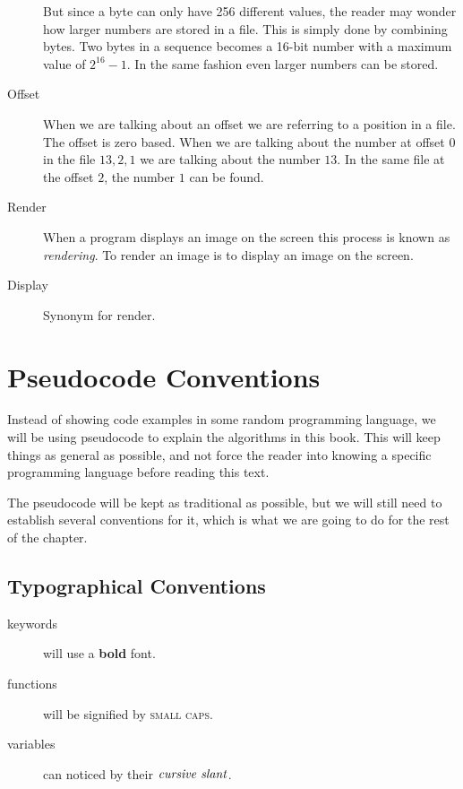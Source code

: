 \begin{description}
  But since a byte can only have 256 different values, the reader may
  wonder how larger numbers are stored in a file. This is simply done
  by combining bytes. Two bytes in a sequence becomes a 16-bit number
  with a maximum value of $2^{16} - 1$. In the same fashion even
  larger numbers can be stored.

\item[Offset] When we are talking about an offset we are referring to
  a position in a file. The offset is zero based. When we are talking
  about the number at offset 0 in the file $13,2,1$ we are talking
  about the number $13$. In the same file at the offset $2$, the
  number $1$ can be found.


\item[Render] When a program displays an image on the screen this
  process is known as \textit{rendering}. To render an image is to
  display an image on the screen.

\item[Display] Synonym for render.

\end{description}

\section{Pseudocode Conventions}

Instead of showing code examples in some random programming language,
we will be using pseudocode to explain the algorithms in this book. This
will keep things as general as possible, and not force the reader into
knowing a specific programming language before reading this text.

The pseudocode will be kept as traditional as possible, but we will
still need to establish several conventions for it, which is what
we are going to do for the rest of the chapter.

\subsection{Typographical Conventions}

\begin{description}
\item[keywords] will use a \textbf{bold} font.
\item[functions] will be signified by \textsc{small caps}.
\item[variables] can noticed by their $\var{cursive\ slant}$.
\end{description}


